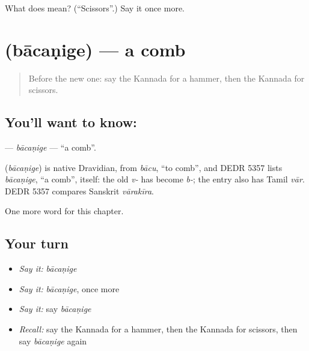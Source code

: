 \begin{tcolorbox}[breakable,colback=teal!4,colframe=teal!35!black,title={Before you move on}]
What does  mean? (\textquotedblleft{}Scissors\textquotedblright{}.) Say it once more.
\end{tcolorbox}
\section[\texorpdfstring{\kn{ಬಾಚಣಿಗೆ} (bācaṇige)}{ಬಾಚಣಿಗೆ (bācaṇige)}]{ (bācaṇige) — a comb}

\label{lesson:KA-C117-bacanige}



\begin{quote}
Before the new one: say the Kannada for a hammer, then the Kannada for scissors.
\end{quote}

\subsection*{You'll want to know: }
\textbf{} — \emph{bācaṇige} — \textquotedblleft{}a comb\textquotedblright{}.

\begin{cousinweb}
\textbf{} (\emph{bācaṇige}) is native Dravidian, from \emph{bācu}, \textquotedblleft{}to comb\textquotedblright{}, and DEDR 5357 lists \emph{bācaṇige}, \textquotedblleft{}a comb\textquotedblright{}, itself: the old \emph{v-} has become \emph{b-}; the entry also has Tamil \emph{vār}. DEDR 5357 compares Sanskrit \emph{vārakīra}.
\end{cousinweb}

\begin{grammarlens}[title={What you've built}]
One more word for this chapter.
\end{grammarlens}

\subsection*{Your turn}
\begin{itemize}
\raggedright
  \item \emph{Say it:} \emph{bācaṇige}
  \item \emph{Say it:} \emph{bācaṇige}, once more
  \item \emph{Say it:} say \emph{bācaṇige}
  \item \emph{Recall:} say the Kannada for a hammer, then the Kannada for scissors, then say \emph{bācaṇige} again
\end{itemize}

